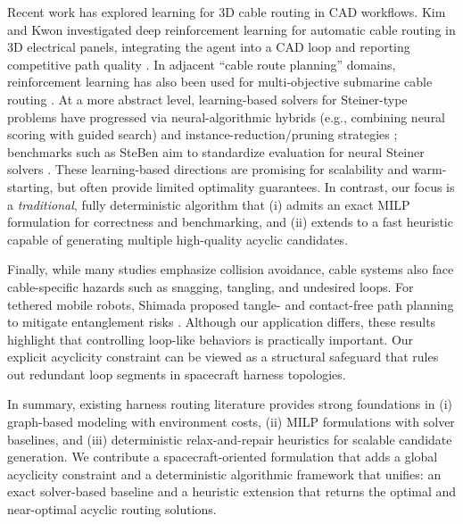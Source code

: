 Recent work has explored learning for 3D cable routing in CAD workflows.
Kim and Kwon investigated deep reinforcement learning for automatic cable routing in 3D electrical panels, integrating the agent into a CAD loop and reporting competitive path quality \cite{kim2025drlpanel}.
In adjacent ``cable route planning'' domains, reinforcement learning has also been used for multi-objective submarine cable routing \cite{zhao2024submarine}.
At a more abstract level, learning-based solvers for Steiner-type problems have progressed via neural-algorithmic hybrids (e.g., combining neural scoring with guided search) \cite{kahng2024nnsteiner} and instance-reduction/pruning strategies \cite{zhang2024prunesteiner}; benchmarks such as SteBen aim to standardize evaluation for neural Steiner solvers \cite{park2024steben}.
These learning-based directions are promising for scalability and warm-starting, but often provide limited optimality guarantees.
In contrast, our focus is a \emph{traditional}, fully deterministic algorithm that (i) admits an exact MILP formulation for correctness and benchmarking, and (ii) extends to a fast heuristic capable of generating multiple high-quality acyclic candidates.

Finally, while many studies emphasize collision avoidance, cable systems also face cable-specific hazards such as snagging, tangling, and undesired loops.
For tethered mobile robots, Shimada \etal{} proposed tangle- and contact-free path planning to mitigate entanglement risks \cite{shimada2024tcfpp}.
Although our application differs, these results highlight that controlling loop-like behaviors is practically important.
Our explicit acyclicity constraint can be viewed as a structural safeguard that rules out redundant loop segments in spacecraft harness topologies.

In summary, existing harness routing literature provides strong foundations in (i) graph-based modeling with environment costs, (ii) MILP formulations with solver baselines, and (iii) deterministic relax-and-repair heuristics for scalable candidate generation.
We contribute a spacecraft-oriented formulation that adds a global acyclicity constraint and a deterministic algorithmic framework that unifies: an exact solver-based baseline and a heuristic extension that returns the optimal and near-optimal acyclic routing solutions.
